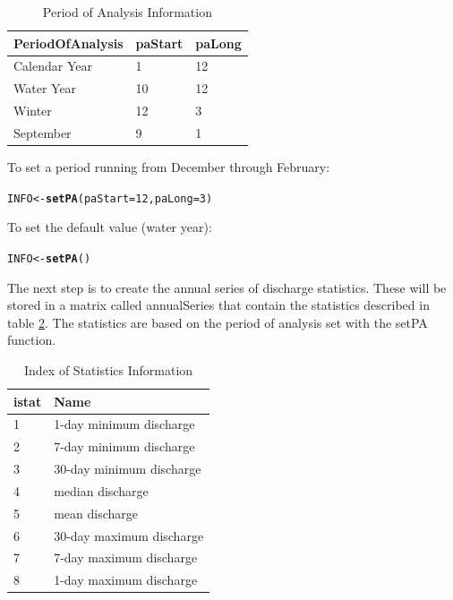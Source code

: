 \documentclass[a4paper,11pt]{article}\usepackage[]{graphicx}\usepackage[]{color}
\makeatletter
\newcommand{\hlnum}[1]{\textcolor[rgb]{0.686,0.059,0.569}{#1}}%
\newcommand{\hlstd}[1]{\textcolor[rgb]{0.345,0.345,0.345}{#1}}%
\newcommand{\hlkwb}[1]{\textcolor[rgb]{0.69,0.353,0.396}{#1}}%
\newcommand{\hlkwc}[1]{\textcolor[rgb]{0.333,0.667,0.333}{#1}}%
\newcommand{\hlkwd}[1]{\textcolor[rgb]{0.737,0.353,0.396}{\textbf{#1}}}%
\newenvironment{kframe}{%
 \def\at@end@of@kframe{}%
 \ifinner\ifhmode%
  \def\at@end@of@kframe{\end{minipage}}%
  \begin{minipage}{\columnwidth}%
 \fi\fi%
 \def\FrameCommand##1{\hskip\@totalleftmargin \hskip-\fboxsep
 \colorbox{shadecolor}{##1}\hskip-\fboxsep
     \hskip-\linewidth \hskip-\@totalleftmargin \hskip\columnwidth}%
 \MakeFramed {\advance\hsize-\width
   \@totalleftmargin\z@ \linewidth\hsize
   \@setminipage}}%
 {\par\unskip\endMakeFramed%
 \at@end@of@kframe}
\newenvironment{knitrout}{}{} %
\makeatother
\begin{document}
\begin{table}[!ht]
\centering
\caption{Period of Analysis Information} 
\label{table:paINFO}
\begin{tabular}{lll}
  \hline
PeriodOfAnalysis & paStart & paLong \\ 
  \hline
Calendar Year & 1 & 12 \\ 
  Water Year & 10 & 12 \\ 
  Winter & 12 & 3 \\ 
  September & 9 & 1 \\ 
   \hline
\end{tabular}
\end{table}

To set a period running from December through February:
\begin{knitrout}
\color{fgcolor}\begin{kframe}
\begin{alltt}
\hlstd{INFO} \hlkwb{<-} \hlkwd{setPA}\hlstd{(}\hlkwc{paStart}\hlstd{=}\hlnum{12}\hlstd{,}\hlkwc{paLong}\hlstd{=}\hlnum{3}\hlstd{)}
\end{alltt}
\end{kframe}
\end{knitrout}

To set the default value (water year):
\begin{knitrout}
\color{fgcolor}\begin{kframe}
\begin{alltt}
\hlstd{INFO} \hlkwb{<-} \hlkwd{setPA}\hlstd{()}
\end{alltt}
\end{kframe}
\end{knitrout}

The next step is to create the annual series of discharge statistics.  These will be stored in a matrix called annualSeries that contain the statistics described in table \ref{table:istat}. The statistics are based on the period of analysis set with the setPA function.

\begin{table}[!ht]
\centering
\caption{Index of Statistics Information} 
\label{table:istat}
\begin{tabular}{ll}
  \hline
istat & Name \\ 
  \hline
1 & 1-day minimum discharge \\ 
  2 & 7-day minimum discharge \\ 
  3 & 30-day minimum discharge \\ 
  4 & median discharge \\ 
  5 & mean discharge \\ 
  6 & 30-day maximum discharge \\ 
  7 & 7-day maximum discharge \\ 
  8 & 1-day maximum discharge \\ 
   \hline
\end{tabular}
\end{table}
\end{document}

